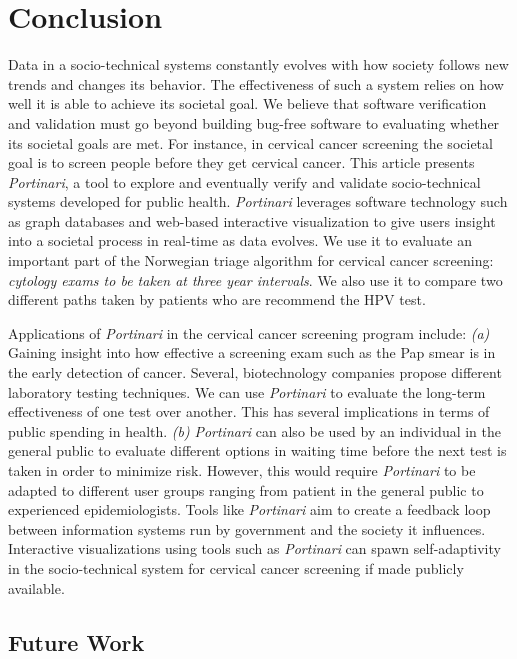 \documentclass[10pt, conference]{IEEEtran}
\begin{document}
\section{Conclusion}
\label{sec:conclusion}

Data in a socio-technical systems constantly evolves with how society follows new trends and changes its behavior. The effectiveness of such a system relies on how well it is able to achieve its societal goal. We believe that software verification and validation must go beyond building bug-free software to evaluating whether its societal goals are met. For instance, in cervical cancer screening the societal goal is to screen people before they get cervical cancer. This article presents \textit{Portinari}, a tool to explore and eventually verify and validate socio-technical systems developed for public health. \textit{Portinari} leverages software technology such as graph databases and web-based interactive visualization to give users insight into a societal process in real-time as data evolves. We use it to evaluate an important part of the Norwegian triage algorithm for cervical cancer screening: \emph{cytology exams to be taken at three year intervals}. We also use it to compare two different paths taken by patients who are recommend the HPV test. 

Applications of \textit{Portinari}  in the cervical cancer screening program include: \textit{(a)} Gaining insight into how effective a screening exam such as the Pap smear is in the early detection of cancer. Several,  biotechnology companies propose different laboratory testing techniques. We can use \textit{Portinari} to evaluate the long-term effectiveness of one test over another. This has several implications in terms of public spending in health. 
\textit{(b)} \textit{Portinari} can also be used by an individual in the general public to evaluate different options in waiting time before the next test is taken in order to minimize risk. However, this would require \textit{Portinari} to be adapted to different user groups ranging from patient in the general public to experienced epidemiologists. Tools like \textit{Portinari} aim to create a feedback loop between information systems run by government and the society it influences. Interactive visualizations using tools such as \textit{Portinari} can spawn self-adaptivity in the socio-technical system for cervical cancer screening if made publicly available.

\subsection{Future Work}
\label{sec:sec:fw}
\end{document}
